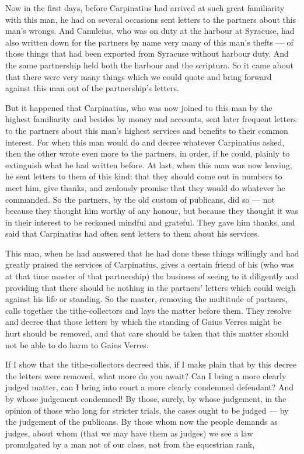  Now in the first days, before Carpinatius had arrived at such great familiarity with this man, he had on several occasions sent letters to the partners about this man's wrongs. And Canuleius, who was on duty at the harbour at Syracuse, had also written down for the partners by name very many of this man's thefts --- of those things that had been exported from Syracuse without harbour duty. And the same partnership held both the harbour and the scriptura. So it came about that there were very many things which we could quote and bring forward against this man out of the partnership's letters.

 But it happened that Carpinatius, who was now joined to this man by the highest familiarity and besides by money and accounts, sent later frequent letters to the partners about this man's highest services and benefits to their common interest. For when this man would do and decree whatever Carpinatius asked, then the other wrote even more to the partners, in order, if he could, plainly to extinguish what he had written before. At last, when this man was now leaving, he sent letters to them of this kind: that they should come out in numbers to meet him, give thanks, and zealously promise that they would do whatever he commanded. So the partners, by the old custom of publicans, did so --- not because they thought him worthy of any honour, but because they thought it was in their interest to be reckoned mindful and grateful. They gave him thanks, and said that Carpinatius had often sent letters to them about his services.

 This man, when he had answered that he had done these things willingly and had greatly praised the services of Carpinatius, gives a certain friend of his (who was at that time master of that partnership) the business of seeing to it diligently and providing that there should be nothing in the partners' letters which could weigh against his life or standing. So the master, removing the multitude of partners, calls together the tithe-collectors and lays the matter before them. They resolve and decree that those letters by which the standing of Gaius Verres might be hurt should be removed, and that care should be taken that this matter should not be able to do harm to Gaius Verres.

 If I show that the tithe-collectors decreed this, if I make plain that by this decree the letters were removed, what more do you await? Can I bring a more clearly judged matter, can I bring into court a more clearly condemned defendant? And by whose judgement condemned! By those, surely, by whose judgement, in the opinion of those who long for stricter trials, the cases ought to be judged --- by the judgement of the publicans. By those whom now the people demands as judges, about whom (that we may have them as judges) we see a law promulgated by a man not of our class, not from the equestrian rank,

